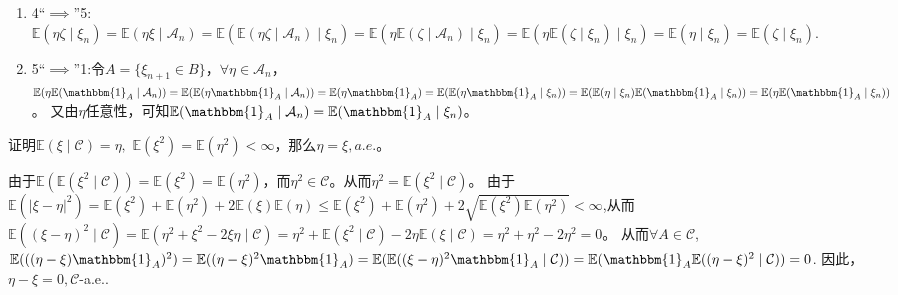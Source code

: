\documentclass{ctexart}
\begin{document}
\begin{solution}
\begin{enumerate}
      同理上一问的证明，只需证明\(\forall A \in \mathcal{C} \)，\(\mathbb{E}(\mathbbm{1}_A \mid \mathcal{A}_n)=\mathbb{E}(\mathbbm{1}_A \mid \xi_n) \)。设\(A=B \times \Omega_{> k + n}, B \in \sigma(\xi_n,\cdots,\xi_{n + k}) \)，
      那么\(\mathbb{E}(\mathbbm{1}_A \mid \mathcal{A}_n)=\mathbbm{E}(\mathbbm{1}_B \mid \mathcal{A}_n), \) \(\mathbb{E}(\mathbbm{1}_A \mid \xi_n)=\mathbb{E}(\mathbbm{1}_B  \mid \xi_n) \)。
      故只需证明\(\forall k \in \mathbb{N}_{+},B \in \sigma(\xi_n,\cdots,\xi_{n + k}) \)有\(\mathbb{E}(\mathbbm{1}_B \mid \mathcal{A}_n)=\mathbb{E}(\mathbbm{1}_B \mid \xi_n) \)。
      故由单调类定理知，只需证明\(\forall A \in \sigma(\xi_{n + k}),k \in \mathbb{N}_{+ } \)，\(\mathbb{E}(\mathbbm{1}_A \mid \mathcal{A}_n)=\mathbb{E}(\mathbbm{1}_A \mid \xi_n) \)。
      只需在第三条中取\(Y_i=\mathbbm{1}_\Omega,1 \leq i \leq k-1, Y_k=\mathbbm{1}_A \)即可，故成立。
    \item 4``\(\implies\)''5:\(\mathbb{E}(\eta \zeta \mid \xi_n) = \mathbb{E}(\eta \xi \mid \mathcal{A}_n)=\mathbb{E}(\mathbb{E}(\eta \zeta \mid \mathcal{A}_n) \mid \xi_n)=\mathbb{E}(\eta \mathbb{E}(\zeta \mid \mathcal{A}_n) \mid \xi_n)=\mathbb{E}(\eta \mathbb{E}(\zeta \mid \xi_n) \mid \xi_n)=\mathbb{E}(\eta \mid \xi_n)=\mathbb{E}(\zeta \mid \xi_n) \).
    \item 5``\(\implies\)''1:令\(A=\{\xi_{n + 1} \in B\} \)，\(\forall \eta  \in \mathcal{A}_n \)，
      \(\mathbb{E}(\eta \mathbb{E}(\mathbbm{1}_A \mid \mathcal{A}_n))=\mathbb{E}(\mathbb{E}(\eta \mathbbm{1}_A \mid \mathcal{A}_n))=\mathbb{E}(\eta \mathbbm{1}_A)=\mathbb{E}(\mathbb{E}(\eta \mathbbm{1}_A \mid \xi_n))=\mathbb{E}(\mathbb{E}(\eta \mid \xi_n) \mathbb{E}(\mathbbm{1}_A \mid \xi_n))=\mathbb{E}(\eta \mathbb{E}(\mathbbm{1}_A \mid \xi_n)) \)。
      又由\(\eta \)任意性，可知\(\mathbb{E}(\mathbbm{1}_A \mid \mathcal{A}_n) =\mathbb{E}(\mathbbm{1}_A \mid \xi_n)\)。
  \end{enumerate}
\end{solution}

\begin{problem}\label{pro:15}
  证明\(\mathbb{E}(\xi \mid \mathcal{C})=\eta, \) \(\mathbb{E}(\xi^2)=\mathbb{E}(\eta^2)<\infty \)，那么\(\eta=\xi,a.e. \)。
\end{problem}
\begin{solution}
  由于\(\mathbb{E} (\mathbb{E}(\xi^2 \mid \mathcal{C}) )=\mathbb{E}(\xi^2)=\mathbb{E}(\eta^2)\)，而\(\eta^2 \in \mathcal{C} \)。从而\(\eta^2=\mathbb{E}(\xi^2 \mid \mathcal{C}) \)。
  由于\(\mathbb{E}(|\xi-\eta|^2) = \mathbb{E}(\xi^2) + \mathbb{E}(\eta^2) + 2 \mathbb{E}(\xi)\mathbb{E}(\eta) \leq \mathbb{E}(\xi^2) + \mathbb{E}(\eta^2) + 2 \sqrt{\mathbb{E}(\xi^2) \mathbb{E}(\eta^2)} < \infty\),从而\(\mathbb{E}((\xi-\eta)^2 \mid \mathcal{C})=\mathbb{E}(\eta ^2 + \xi^2 -2 \xi \eta \mid \mathcal{C})=\eta^2 + \mathbb{E}(\xi^2 \mid \mathcal{C}) -2\eta \mathbb{E}(\xi \mid \mathcal{C}) =\eta^2 + \eta^2 -2\eta^2=0\)。
  从而\(\forall A \in \mathcal{C} \),\(\mathbb{E}(((\eta-\xi)\mathbbm{1}_A )^2)=\mathbb{E}((\eta-\xi)^2 \mathbbm{1}_A)=\mathbb{E}(\mathbb{E}((\xi-\eta)^2 \mathbbm{1}_A \mid \mathcal{C}))=\mathbb{E}(\mathbbm{1}_A\mathbb{E}((\eta-\xi)^2 \mid \mathcal{C}))=0 \).
  因此，\(\eta-\xi=0,\mathcal{C} \)-a.e..
\end{solution}
\end{document}
